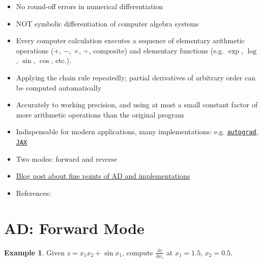 \documentclass[10pt]{extarticle}
\newcommand{\ds}{\displaystyle}
\theoremstyle{definition}
\newtheorem*{ex}{Example}
\begin{document}
\begin{itemize}
  \item No round-off errors in numerical differentiation
  \item NOT symbolic differentiation of computer algebra systems
  \item Every computer calculation executes a sequence of elementary arithmetic operations ($+$, $-$, $\times$, $\div$, composite) and elementary functions (e.g. $\exp$, $\log$, $\sin$, $\cos$, etc.). 
  \item Applying the chain rule repeatedly; partial derivatives of arbitrary order can be computed automatically
  \item Accurately to working precision, and using at most a small constant factor of more arithmetic operations than the original program
  \item Indispensable for modern applications, many implementations: e.g. \href{https://github.com/HIPS/autograd}{{\tt autograd}}, \href{https://github.com/google/jax}{{\tt JAX}}
  \item Two modes: forward and reverse
  \item \href{https://jingnanshi.com/blog/autodiff.html}{Blog post about fine points of AD and implementations}
  \item References: \citet{naumann,griewank}
\end{itemize}

\newpage

\section*{AD: Forward Mode}

\begin{ex}
  Given $\ds z = x_1 x_2 + \sin x_1$, compute $\ds\frac{\partial z}{\partial x_1}$ at $x_1 = 1.5$, $x_2 = 0.5$.
\end{ex}
\end{document}
